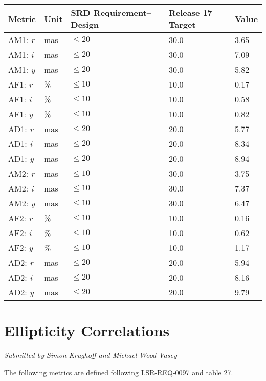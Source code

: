 \documentclass[DM,toc]{lsstdoc}
\begin{document}
\begin{longtable}{L{0.19\columnwidth}L{0.08\columnwidth}L{0.2\columnwidth}R{0.22\columnwidth}R{0.17\columnwidth}}
\toprule
Metric &
Unit &
SRD Requirement--Design &
Release 17 Target &
Value
\tabularnewline
\midrule
\endhead
AM1: \emph{r} &
mas &
\(\leq 20\) &
30.0 &
3.65
\tabularnewline
AM1: \emph{i} &
mas &
\(\leq 20\) &
30.0 &
7.09
\tabularnewline
AM1: \emph{y} &
mas &
\(\leq 20\) &
30.0 &
5.82
\tabularnewline
AF1: \emph{r} &
\% &
\(\leq 10\) &
10.0 &
0.17
\tabularnewline
AF1: \emph{i} &
\% &
\(\leq 10\) &
10.0 &
0.58
\tabularnewline
AF1: \emph{y} &
\% &
\(\leq 10\) &
10.0 &
0.82
\tabularnewline
AD1: \emph{r} &
mas &
\(\leq 20\) &
20.0 &
5.77
\tabularnewline
AD1: \emph{i} &
mas &
\(\leq 20\) &
20.0 &
8.34
\tabularnewline
AD1: \emph{y} &
mas &
\(\leq 20\) &
20.0 &
8.94
\tabularnewline
AM2: \emph{r} &
mas &
\(\leq 10\) &
30.0 &
3.75
\tabularnewline
AM2: \emph{i} &
mas &
\(\leq 10\) &
30.0 &
7.37
\tabularnewline
AM2: \emph{y} &
mas &
\(\leq 10\) &
30.0 &
6.47
\tabularnewline
AF2: \emph{r} &
\% &
\(\leq 10\) &
10.0 &
0.16
\tabularnewline
AF2: \emph{i} &
\% &
\(\leq 10\) &
10.0 &
0.62
\tabularnewline
AF2: \emph{y} &
\% &
\(\leq 10\) &
10.0 &
1.17
\tabularnewline
AD2: \emph{r} &
mas &
\(\leq 20\) &
20.0 &
5.94
\tabularnewline
AD2: \emph{i} &
mas &
\(\leq 20\) &
20.0 &
8.16
\tabularnewline
AD2: \emph{y} &
mas &
\(\leq 20\) &
20.0 &
9.79
\tabularnewline
\bottomrule
\end{longtable}

\section{Ellipticity Correlations}\label{ellipticity-correlations}

\emph{Submitted by Simon Krughoff and Michael Wood-Vasey}

The following metrics are defined following LSR-REQ-0097
 and  table 27.
\end{document}
